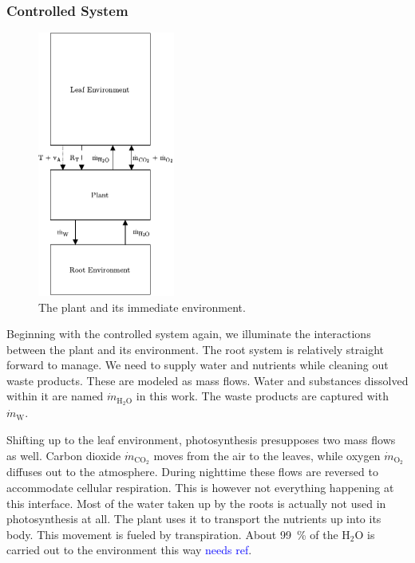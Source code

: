 \subsubsection{Controlled System}
\begin{figure}
	\caption{The plant and its immediate environment.}
	\label{wfig:controlled-system}
	\includegraphics[width=0.4\textwidth]{img/controlled-system.pdf}
\end{figure} 

Beginning with the controlled system again, we illuminate the interactions between the plant and its environment.
The root system is relatively straight forward to manage.
We need to supply water and nutrients while cleaning out waste products.
These are modeled as mass flows.
Water and substances dissolved within it are named $\dot{m}_{\text{H}_2\text{O}}$ in this work.
The waste products are captured with $\dot{m}_\text{W}$.

Shifting up to the leaf environment, photosynthesis presupposes two mass flows as well.
Carbon dioxide $\dot{m}_{\text{CO}_2}$ moves from the air to the leaves, while oxygen $\dot{m}_{\text{O}_2}$ diffuses out to the atmosphere.
During nighttime these flows are reversed to accommodate cellular respiration.
This is however not everything happening at this interface.
Most of the water taken up by the roots is actually not used in photosynthesis at all.
The plant uses it to transport the nutrients up into its body.
This movement is fueled by transpiration.
About \SI{99}{\percent} of the $\text{H}_2\text{O}$ is carried out to the environment this way \textcolor{Blue}{needs ref}.

